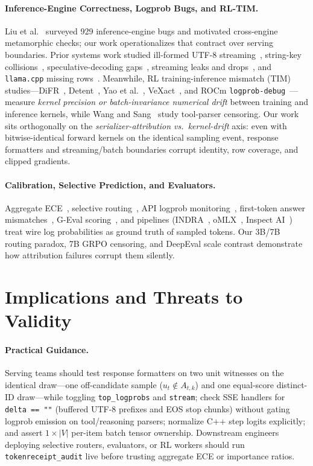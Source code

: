 \documentclass[11pt,letterpaper]{article}
\begin{document}
\paragraph{Inference-Engine Correctness, Logprob Bugs, and RL-TIM.}
Liu et al.~\cite{liuinference} surveyed 929 inference-engine bugs and motivated cross-engine metamorphic checks; our work operationalizes that contract over serving boundaries. Prior systems work studied ill-formed UTF-8 streaming~\cite{utf8plumbing,ollamabytes}, string-key collisions~\cite{vllmreport}, speculative-decoding gaps~\cite{llamareport}, streaming leaks and drops~\cite{sgstream,mlxstream}, and \texttt{llama.cpp} missing rows~\cite{murphy}. Meanwhile, RL training-inference mismatch (TIM) studies---DiFR~\cite{difr}, Detent~\cite{detent}, Yao et al.~\cite{yao2025offpolicy}, VeXact~\cite{zhong2026vexact}, and ROCm \texttt{logprob-debug}~\cite{kang2026rocm}---measure \emph{kernel precision or batch-invariance numerical drift} between training and inference kernels, while Wang and Sang~\cite{censoring} study tool-parser censoring. Our work sits orthogonally on the \emph{serializer-attribution vs.\ kernel-drift} axis: even with bitwise-identical forward kernels on the identical sampling event, response formatters and streaming/batch boundaries corrupt identity, row coverage, and clipped gradients.

\paragraph{Calibration, Selective Prediction, and Evaluators.}
Aggregate ECE~\cite{guo2017calibration}, selective routing~\cite{geifman2017selective}, API logprob monitoring~\cite{monitor}, first-token answer mismatches~\cite{firsttoken}, G-Eval scoring~\cite{liu2023geval,gevalpkg}, and pipelines (INDRA~\cite{indra}, oMLX~\cite{omlx,omlxuser}, Inspect AI~\cite{inspect}) treat wire log probabilities as ground truth of sampled tokens. Our 3B/7B routing paradox, 7B GRPO censoring, and DeepEval scale contrast demonstrate how attribution failures corrupt them silently.

\section{Implications and Threats to Validity}
\paragraph{Practical Guidance.}
Serving teams should test response formatters on two unit witnesses on the identical draw---one off-candidate sample ($u_t \notin A_{t,k}$) and one equal-score distinct-ID draw---while toggling \texttt{top\_logprobs} and \texttt{stream}; check SSE handlers for \texttt{delta == ""} (buffered UTF-8 prefixes and EOS stop chunks) without gating logprob emission on tool/reasoning parsers; normalize C++ step logits explicitly; and assert $1\times |V|$ per-item batch tensor ownership. Downstream engineers deploying selective routers, evaluators, or RL workers should run \texttt{tokenreceipt\_audit} live before trusting aggregate ECE or importance ratios.
\end{document}
